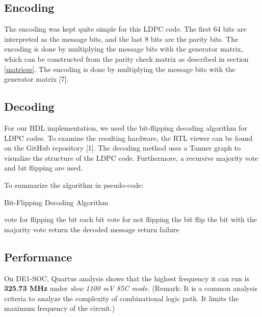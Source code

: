 \documentclass[conference]{IEEEtran}
\begin{document}
\subsection{Encoding}
The encoding was kept quite simple for this LDPC code.
The first 64 bits are interpreted as the message bits, and the last 8 bits are the parity bits.
The encoding is done by multiplying the message bits with the generator matrix, which can be constructed from the parity check matrix as described in section \ref{matrices}.
The encoding is done by multiplying the message bits with the generator matrix [7].
\subsection{Decoding}
For our HDL implementation, we used the bit-flipping decoding algorithm for LDPC codes.
To examine the resulting hardware, the RTL viewer can be found on the GitHub repository [1]. 
The decoding method uses a Tanner graph to visualize the structure of the LDPC code.
Furthermore, a recursive majority vote and bit flipping are used.

To summarize the algorithm in pseudo-code:
\begin{algorithm}
  \caption{Bit-Flipping Decoding Algorithm}
  \begin{algorithmic}
          \STATE vote for flipping the bit
        \ELSE
        \ENDIF
      \ENDFOR
      \STATE each bit vote for not flipping the bit
      \STATE flip the bit with the majority vote
    \ENDWHILE
    \STATE return the decoded message
    \ELSE
    \STATE return failure
    \ENDIF
  \end{algorithmic}
\end{algorithm}

\subsection{Performance}
On DE1-SOC, Quartus analysis shows that the highest frequency it can run is \textbf{325.73 MHz} under \textit{slow 1100 mV 85C mode}. (Remark: It is a common analysis criteria to analyze the complexity of combinational logic path. It limits the maximum frequency of the circuit.)
\end{document}
